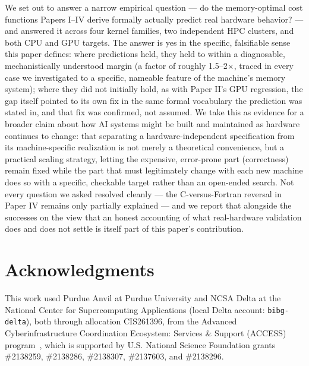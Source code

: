 \documentclass[11pt]{article}
\begin{document}
We set out to answer a narrow empirical question --- do the memory-optimal
cost functions Papers I--IV derive formally actually predict real
hardware behavior? --- and answered it across four kernel families, two
independent HPC clusters, and both CPU and GPU targets. The answer is
yes in the specific, falsifiable sense this paper defines: where
predictions held, they held to within a diagnosable, mechanistically
understood margin (a factor of roughly 1.5--2$\times$, traced in every
case we investigated to a specific, nameable feature of the machine's
memory system); where they did not initially hold, as with Paper II's
GPU regression, the gap itself pointed to its own fix in the same
formal vocabulary the prediction was stated in, and that fix was
confirmed, not assumed. We take this as evidence for a broader claim
about how AI systems might be built and maintained as hardware
continues to change: that separating a hardware-independent
specification from its machine-specific realization is not merely a
theoretical convenience, but a practical scaling strategy, letting the
expensive, error-prone part (correctness) remain fixed while the part
that must legitimately change with each new machine does so with a
specific, checkable target rather than an open-ended search. Not every
question we asked resolved cleanly --- the C-versus-Fortran reversal in
Paper IV remains only partially explained --- and we report that
alongside the successes on the view that an honest accounting of what
real-hardware validation does and does not settle is itself part of
this paper's contribution.

\section*{Acknowledgments}

This work used Purdue Anvil at Purdue University and NCSA Delta at the
National Center for Supercomputing Applications (local Delta account:
\texttt{bibg-delta}), both through allocation CIS261396, from the
Advanced Cyberinfrastructure Coordination Ecosystem: Services \&
Support (ACCESS) program~\cite{access2023}, which is supported by U.S.
National Science Foundation grants \#2138259, \#2138286, \#2138307,
\#2137603, and \#2138296.
\end{document}
